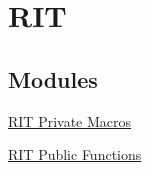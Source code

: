 \hypertarget{group___r_i_t}{\section{\-R\-I\-T}
\label{group___r_i_t}
}
\subsection*{\-Modules}
\begin{DoxyCompactItemize}
\item 
\hyperlink{group___r_i_t___private___macros}{\-R\-I\-T Private Macros}
\item 
\hyperlink{group___r_i_t___public___functions}{\-R\-I\-T Public Functions}
\end{DoxyCompactItemize}
